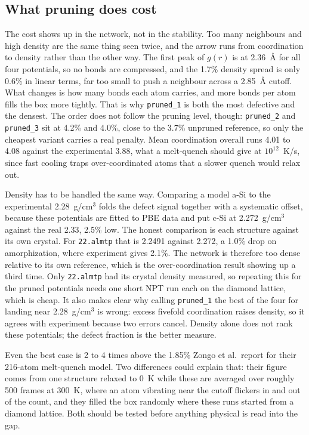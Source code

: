 \documentclass[11pt]{article}
\begin{document}
\subsection{What pruning does cost}
\label{sec:disc_cost}
The cost shows up in the network, not in the stability. Too many neighbours and high density are the same thing seen twice, and the arrow runs from coordination to density rather than the other way. The first peak of $g(r)$ is at 2.36~\AA{} for all four potentials, so no bonds are compressed, and the 1.7\% density spread is only 0.6\% in linear terms, far too small to push a neighbour across a 2.85~\AA{} cutoff. What changes is how many bonds each atom carries, and more bonds per atom fills the box more tightly. That is why \texttt{pruned\_1} is both the most defective and the densest. The order does not follow the pruning level, though: \texttt{pruned\_2} and \texttt{pruned\_3} sit at 4.2\% and 4.0\%, close to the 3.7\% unpruned reference, so only the cheapest variant carries a real penalty. Mean coordination overall runs 4.01 to 4.08 against the experimental 3.88, what a melt-quench should give at $10^{12}$~K/s, since fast cooling traps over-coordinated atoms that a slower quench would relax out.

Density has to be handled the same way. Comparing a model a-Si to the experimental 2.28~g/cm$^3$ folds the defect signal together with a systematic offset, because these potentials are fitted to PBE data and put c-Si at 2.272~g/cm$^3$ against the real 2.33, 2.5\% low. The honest comparison is each structure against its own crystal. For \texttt{22.almtp} that is 2.2491 against 2.272, a 1.0\% drop on amorphization, where experiment gives 2.1\%. The network is therefore too dense relative to its own reference, which is the over-coordination result showing up a third time. Only \texttt{22.almtp} had its crystal density measured, so repeating this for the pruned potentials needs one short NPT run each on the diamond lattice, which is cheap. It also makes clear why calling \texttt{pruned\_1} the best of the four for landing near 2.28~g/cm$^3$ is wrong: excess fivefold coordination raises density, so it agrees with experiment because two errors cancel. Density alone does not rank these potentials; the defect fraction is the better measure.

Even the best case is 2 to 4 times above the 1.85\% Zongo et al.\ report for their 216-atom melt-quench model. Two differences could explain that: their figure comes from one structure relaxed to 0~K while these are averaged over roughly 500 frames at 300~K, where an atom vibrating near the cutoff flickers in and out of the count, and they filled the box randomly where these runs started from a diamond lattice. Both should be tested before anything physical is read into the gap.
\end{document}
